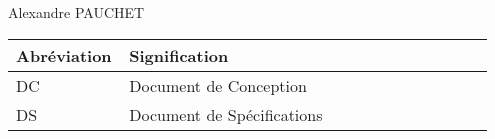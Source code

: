 \begin{pagesService}

  \begin{historique}
  \end{historique}

  \begin{suiviDiffusions}
    
    {
      \begin{lesDestinataires}
      \item Alexandre PAUCHET
      \end{lesDestinataires}
    }
  \end{suiviDiffusions}

  \begin{signatures}
  \end{signatures}
  \begin{documentsReference}
    \begin{listeDeReferences}
    \end{listeDeReferences}	
  \end{documentsReference}

  \begin{terminologie}
    \begin{center}
      \begin{longtable}{|p{0.2\linewidth}|p{0.75\linewidth}|}
        \hline  %
        \rowcolor[gray]{.8}
        Abréviation         &             Signification    \\
        \hline
        DC & Document de Conception \\
		\hline
        DS & Document de Spécifications \\
        \hline
      \end{longtable}
    \end{center}
  \end{terminologie}
\end{pagesService}
